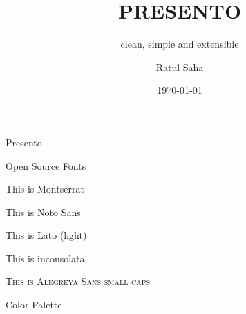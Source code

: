 \documentclass[14pt]{beamer}
\title{PRESENTO}
\subtitle{clean, simple and extensible}
\author{Ratul Saha}
\institute{www.ratulsaha.com}
\date{\today}
\begin{document}
\begin{frame}[plain]
\maketitle
\end{frame}

\begin{frame}{Presento}
 \begin{fullpageitemize}
  \item \begin{center}\end{center}
  \item \begin{center}\end{center}
  \item \begin{center}\end{center}
 \end{fullpageitemize}
\end{frame}

\begin{frame}{Open Source Fonts}
 \begin{fullpageitemize}
  \item {\montserratfont This is Montserrat}
  \item {\notosansfont This is Noto Sans}
  \item {\latolightfont This is Lato (light)}
  \item {\inconsolatafont This is inconsolata}
  \item \textsc{This is Alegreya Sans small caps}
 \end{fullpageitemize}
\end{frame}

\begin{frame}{Color Palette}
 \begin{center}
  \crule[colordgray] \crule[colorhgray] \crule[colorblue] \crule[colorgreen] \crule[colororange]
 \end{center}
\end{frame}


\end{document}
